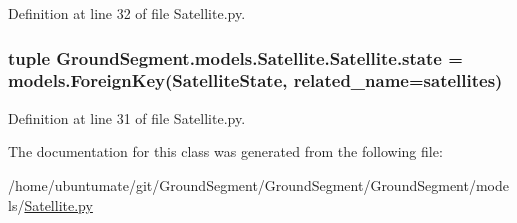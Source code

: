 Definition at line 32 of file Satellite.\+py.

\hypertarget{class_ground_segment_1_1models_1_1_satellite_1_1_satellite_a4cdd4dae77da6f58058ca51ac71bd31d}{}
\subsubsection[{state}]{\setlength{\rightskip}{0pt plus 5cm}tuple Ground\+Segment.\+models.\+Satellite.\+Satellite.\+state = models.\+Foreign\+Key({\bf Satellite\+State}, related\+\_\+name=\textquotesingle{}satellites\textquotesingle{})\hspace{0.3cm}{\ttfamily [static]}}\label{class_ground_segment_1_1models_1_1_satellite_1_1_satellite_a4cdd4dae77da6f58058ca51ac71bd31d}


Definition at line 31 of file Satellite.\+py.



The documentation for this class was generated from the following file\+:\begin{DoxyCompactItemize}
\item 
/home/ubuntumate/git/\+Ground\+Segment/\+Ground\+Segment/\+Ground\+Segment/models/\hyperlink{_satellite_8py}{Satellite.\+py}\end{DoxyCompactItemize}
